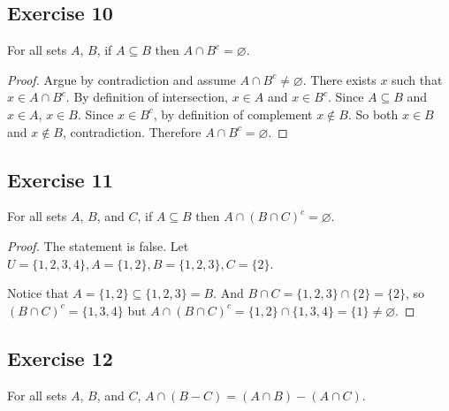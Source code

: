 \documentclass[14pt]{extarticle}
\newcommand{\es}{\varnothing}
\begin{document}
\subsection{Exercise 10}
For all sets $A$, $B$, if \(A \subseteq B\) then \(A \cap B^c = \es\).

\begin{proof}
  Argue by contradiction and assume \(A \cap B^c \neq \es\).
  There exists $x$ such that \(x \in A \cap B^c \). By definition of intersection, $x \in A$ and $x \in B^c$.
  Since \(A \subseteq B\) and \(x \in A\), \(x \in B\). Since $x \in B^c$, by definition of complement \(x \notin B\).
  So both \(x \in B\) and \(x \notin B\), contradiction.
  Therefore \(A \cap B^c = \es\).
\end{proof}

\subsection{Exercise 11}
For all sets $A$, $B$, and $C$, if \(A \subseteq B\) then \(A \cap (B \cap C)^c = \es\).

\begin{proof}
  The statement is false. Let \(U = \{1, 2, 3, 4\}, A = \{1, 2\}, B = \{1, 2, 3\}, C = \{2\}\).

  Notice that \(A = \{1, 2\} \subseteq \{1, 2, 3\} = B\). And \(B \cap C = \{1, 2, 3\} \cap \{2\} = \{2\}\), so
  \((B \cap C)^c = \{1, 3, 4\}\) but \(A \cap (B \cap C)^c = \{1, 2\} \cap \{1, 3, 4\} = \{1\} \neq \es\).
\end{proof}

\subsection{Exercise 12}
For all sets $A$, $B$, and $C$, \(A \cap (B - C) = (A \cap B) - (A \cap C)\).
\end{document}
